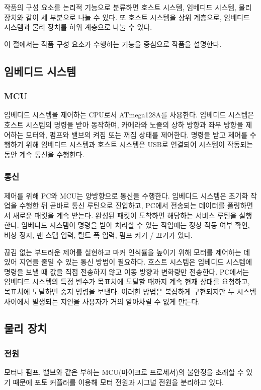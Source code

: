 \documentclass[chapter,11pt,oneside,openany]{xoblivoir}
\begin{document}
작품의 구성 요소를 논리적 기능으로 분류하면 호스트 시스템, 임베디드 시스템,
물리 장치와 같이 세 부분으로 나눌 수 있다. 또 호스트 시스템을 상위 계층으로,
임베디드 시스템과 물리 장치를 하위 계층으로 나눌 수 있다.

이 절에서는 작품 구성 요소가 수행하는 기능을 중심으로 작품을 설명한다.

\subsection{임베디드 시스템}

\subsubsection{MCU}
임베디드 시스템을 제어하는 CPU로서 ATmega128A를 사용한다.
임베디드 시스템은 호스트 시스템의 명령을 받아 동작하며, 카메라와 노즐의 상하 방향과 좌우 방향을 제어하는 모터와,
펌프와 밸브의 켜짐 또는 꺼짐 상태를 제어한다.
명령을 받고 제어를 수행하기 위해 임베디드 시스템과 호스트 시스템은 USB로 연결되어 시스템이 작동되는 동안 계속 통신을 수행한다.

\subsubsection{통신}
제어를 위해 PC와 MCU는 양방향으로 통신을 수행한다.
임베디드 시스템은 초기화 작업을 수행한 뒤 곧바로 통신 루틴으로 진입하고,
PC에서 전송되는 데이터를 폴링하면서 새로운 패킷을 계속 받는다. 완성된 패킷이 도착하면 해당하는 서비스 루틴을 실행한다.
임베디드 시스템이 명령을 받아 처리할 수 있는 작업에는
정상 작동 여부 확인, 비상 정지, 팬 스텝 입력, 틸트 폭 입력, 펌프 켜기 / 끄기가 있다.

끊김 없는 부드러운 제어를 실현하고 마커 인식률을 높이기 위해
모터를 제어하는 데 있어 지연을 줄일 수 있는 통신 방법이 필요하다.
호스트 시스템은 임베디드 시스템에 명령을 보낼 때 값을 직접 전송하지 않고
이동 방향과 변화량만 전송한다. PC에서는 임베디드 시스템의 특정 변수가 목표치에
도달할 때까지 계속 현재 상태를 요청하고, 목표치에 도달하면 중지 명령을 보낸다.
이러한 방법은 복잡하게 구현되지만 두 시스템 사이에서 발생되는 지연을 사용자가
거의 알아차릴 수 없게 만든다.


\subsection{물리 장치}

\subsubsection{전원}
모터나 펌프, 밸브와 같은 부하는 MCU(마이크로 프로세서)의 불안정을
초래할 수 있기 때문에 포토 커플러를 이용해 모터 전원과 시그널 전원을
분리하고 있다.
\end{document}
